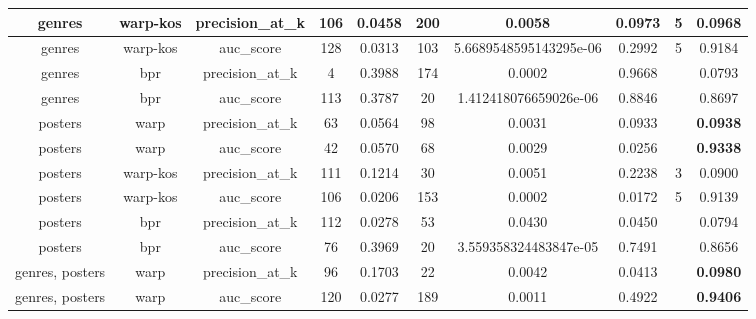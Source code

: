 \begin{table}
{\begin{tabular}{|c|c|c|c|c|c|c|c|c|c|}
\hline
genres                    & warp-kos              & precision\_at\_k          & 106    & 0.0458   & 200           & 0.0058   & 0.0973   & 5    & 0.0968                    \\ 
\hline
genres                    & warp-kos              & auc\_score                & 128    & 0.0313  & 103           & 5.6689548595143295e-06 & 0.2992    & 5    & 0.9184                    \\ 
\hline
genres                    & bpr                   & precision\_at\_k          & 4      & 0.3988    & 174           & 0.0002 & 0.9668    &      & 0.0793                    \\ 
\hline
genres                    & bpr                   & auc\_score                & 113    & 0.3787    & 20            & 1.412418076659026e-06  & 0.8846    &      & 0.8697                    \\ 
\hline
posters                  & warp                  & precision\_at\_k          & 63     & 0.0564   & 98            & 0.0031  & 0.0933    &      & \textbf{0.0938}                    \\ 
\hline
posters                  & warp                  & auc\_score                & 42     & 0.0570    & 68            & 0.0029  & 0.0256   &      & \textbf{0.9338}                    \\ 
\hline
posters                  & warp-kos              & precision\_at\_k          & 111    & 0.1214   & 30            & 0.0051   & 0.2238   & 3    & 0.0900                    \\ 
\hline
posters                  & warp-kos              & auc\_score                & 106    & 0.0206   & 153           & 0.0002  & 0.0172   & 5    & 0.9139                    \\ 
\hline
posters                  & bpr                   & precision\_at\_k          & 112    & 0.0278   & 53            & 0.0430   & 0.0450  &      & 0.0794                    \\ 
\hline
posters                  & bpr                   & auc\_score                & 76     & 0.3969   & 20            & 3.559358324483847e-05  & 0.7491     &      & 0.8656                    \\ 
\hline
genres, posters          & warp                  & precision\_at\_k          & 96     & 0.1703    & 22            & 0.0042   & 0.0413  &      & \textbf{0.0980}                    \\ 
\hline
genres, posters          & warp                  & auc\_score                & 120    & 0.0277  & 189           & 0.0011  & 0.4922    &      & \textbf{0.9406}                    \\ 

\end{tabular}}
\end{table}
